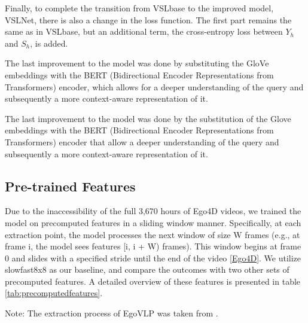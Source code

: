 \documentclass[10pt,twocolumn,letterpaper]{article}
\begin{document}
Finally, to complete the transition from VSLbase to the improved model, VSLNet, there is also a change in the loss function. The first part remains the same as in VSLbase, but an additional term, the cross-entropy loss between $Y_{h}$ and $S_{h}$, is added.

The last improvement to the model was done by substituting the GloVe embeddings with the BERT (Bidirectional Encoder Representations from Transformers) encoder, which allows for a deeper understanding of the query and subsequently a more context-aware representation of it.

The last improvement to the model was done by the substitution of the Glove embeddings with the BERT (Bidirectional Encoder Representations from Transformers) encoder that allow a deeper understanding of the query and subsequently a more context-aware representation of it.

\subsection{Pre-trained Features}
Due to the inaccessibility of the full 3,670 hours of Ego4D videos, we trained the model on precomputed features in a sliding window manner. Specifically, at each extraction point, the model processes the next window of size W frames (e.g., at frame i, the model sees features [i, i + W) frames). This window begins at frame 0 and slides with a specified stride until the end of the video [\href{https://ego4d-data.org/docs/data/features/}{Ego4D}]. We utilize slowfast8x8 as our baseline, and compare the outcomes with two other sets of precomputed features. A detailed overview of these features is presented in table \ref{tab:precomputedfeatures}.

\begin{table}[h]
\centering
\caption{Pre-computed Features for Ego4D}
\label{tab:precomputedfeatures}
\setlength{\tabcolsep}{4pt}
\renewcommand{\arraystretch}{1.2}

\begin{minipage}{\linewidth}
\vspace{0.1cm}  %
{\footnotesize * Note: The extraction process of EgoVLP was taken from \cite{egoVLP}.}  
\end{minipage}
\end{table}
\end{document}
